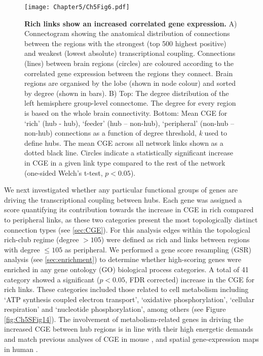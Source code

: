 \begin{figure}[h!]
\begin{center}
\texttt{[image: Chapter5/Ch5Fig6.pdf]}%
\end{center}
\caption{\textbf{Rich links show an increased correlated gene expression.}
A) Connectogram showing the anatomical distribution of connections between the regions with the strongest (top 500 highest positive) and weakest (lowest absolute) transcriptional coupling. Connections (lines) between brain regions (circles) are coloured according to the correlated gene expression between the regions they connect. Brain regions are organised by the lobe (shown in node colour) and sorted by degree (shown in bars). B) Top: The degree distribution of the left hemisphere group-level connectome. The degree for every region is based on the whole brain connectivity. Bottom: Mean CGE for `rich' (hub - hub), `feeder' (hub – non-hub), `peripheral' (non-hub – non-hub) connections as a function of degree threshold, \textit{k} used to define hubs. The mean CGE across all network links shown as a dotted black line. Circles indicate a statistically significant increase in CGE in a given link type compared to the rest of the network (one-sided Welch's t-test, $p < 0.05$).}
\label{fig:Ch5Fig6}
\end{figure}

We next investigated whether any particular functional groups of genes are driving the transcriptional coupling between hubs. Each gene was assigned a score quantifying its contribution towards the increase in CGE in rich compared to peripheral links, as these two categories present the most topologically distinct connection types (see \ref{sec:CGE}). For this analysis edges within the topological rich-club regime (degree $> 105$) were defined as rich and links between regions with degree $\leq105$ as peripheral. We performed a gene score resampling (GSR) analysis (see \ref{sec:enrichment}) to determine whether high-scoring genes were enriched in any gene ontology (GO) biological process categories. A total of 41 category showed a significant ($p<0.05$, FDR corrected) increase in the CGE for rich links. These categories included those related to cell metabolism including `ATP synthesis coupled electron transport', `oxidative phosphorylation', `cellular respiration' and `nucleotide phosphorylation', among others (see Figure \ref{fig:Ch5SFig14}). The involvement of metabolism-related genes in driving the increased CGE between hub regions is in line with their high energetic demands \citep{Bullmore2012,Collin2014,Liang2013a,Tomasi2013} and match previous analyses of CGE in mouse \citep{Fulcher2016}, and spatial gene-expression maps in human \citep{Vertes2016b}.


